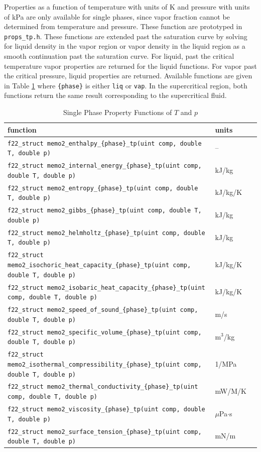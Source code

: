 \documentclass[oneside]{book}
\begin{document}
Properties as a function of temperature with units of K and pressure with units of kPa are only available for single phases, since vapor fraction cannot be determined from temperature and pressure.  These function are prototyped in \texttt{props\_tp.h}.  These functions are extended past the saturation curve by solving for liquid density in the vapor region or vapor density in the liquid region as a smooth continuation past the saturation curve.  For liquid, past the critical temperature vapor properties are returned for the liquid functions.  For vapor past the critical pressure, liquid properties are returned. Available functions are given in Table \ref{table:single_tp_props} where \texttt{\{phase\}} is either \texttt{liq} or \texttt{vap}.  In the supercritical region, both functions return the same result corresponding to the supercritical fluid.

\begin{table}[h!]
\centering
\caption{Single Phase Property Functions of $T$ and $p$}
\begin{tabular}{ l l l }
\hline
function & units \\
\hline
\hline
\texttt{f22\_struct memo2\_enthalpy\_\{phase\}\_tp(uint comp, double T, double p)} & -- \\ [1ex]
\texttt{f22\_struct memo2\_internal\_energy\_\{phase\}\_tp(uint comp, double T, double p)} &  kJ/kg \\ [1ex]
\texttt{f22\_struct memo2\_entropy\_\{phase\}\_tp(uint comp, double T, double p)} &  kJ/kg/K \\ [1ex]
\texttt{f22\_struct memo2\_gibbs\_\{phase\}\_tp(uint comp, double T, double p)} &  kJ/kg \\ [1ex]
\texttt{f22\_struct memo2\_helmholtz\_\{phase\}\_tp(uint comp, double T, double p)} &  kJ/kg \\ [1ex]
\texttt{f22\_struct memo2\_isochoric\_heat\_capacity\_\{phase\}\_tp(uint comp, double T, double p)} &  kJ/kg/K \\ [1ex]
\texttt{f22\_struct memo2\_isobaric\_heat\_capacity\_\{phase\}\_tp(uint comp, double T, double p)} &  kJ/kg/K \\ [1ex]
\texttt{f22\_struct memo2\_speed\_of\_sound\_\{phase\}\_tp(uint comp, double T, double p)} &  m/s \\ [1ex]
\texttt{f22\_struct memo2\_specific\_volume\_\{phase\}\_tp(uint comp, double T, double p)} &  m$^3$/kg \\ [1ex]
\texttt{f22\_struct memo2\_isothermal\_compressibility\_\{phase\}\_tp(uint comp, double T, double p)} &  1/MPa \\ [1ex]
\texttt{f22\_struct memo2\_thermal\_conductivity\_\{phase\}\_tp(uint comp, double T, double p)} &  mW/M/K \\ [1ex]
\texttt{f22\_struct memo2\_viscosity\_\{phase\}\_tp(uint comp, double T, double p)} &  $\mu$Pa$\cdot$s \\ [1ex]
\texttt{f22\_struct memo2\_surface\_tension\_\{phase\}\_tp(uint comp, double T, double p)} &  mN/m \\ [1ex]
 \hline    
\end{tabular}
\label{table:single_tp_props}
\end{table}
\end{document}
